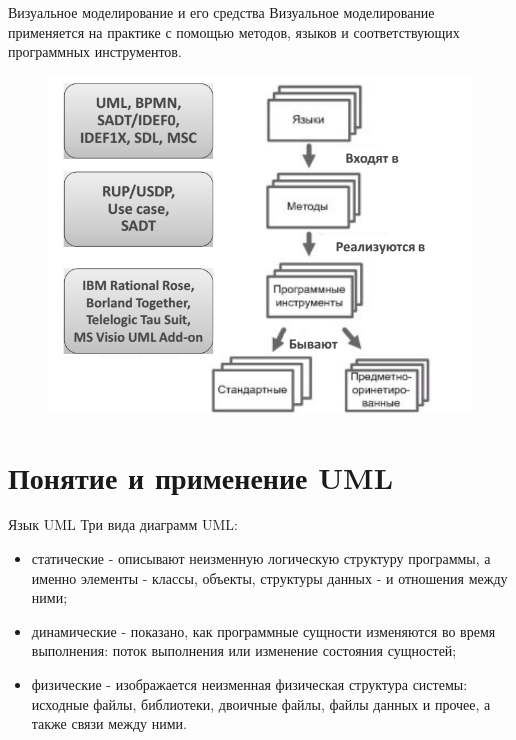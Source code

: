 \documentclass{beamer}
\begin{document}
\begin{frame}[t]{Визуальное моделирование и его средства}
Визуальное моделирование применяется на практике с помощью методов, языков и соответствующих программных инструментов.
\begin{figure}[h]
\centering
\includegraphics[scale=0.45]{images/lec03-pic02.png}
\end{figure}
\end{frame} 

\section{Понятие и применение UML}

\begin{frame}[t]{Язык UML}
Три вида диаграмм UML:
\begin{itemize}
\item статические - описывают неизменную логическую структуру программы, а именно элементы - классы, объекты, структуры данных - и отношения между ними;
\item динамические - показано, как программные сущности изменяются во время выполнения: поток выполнения или изменение состояния сущностей;
\item физические - изображается неизменная физическая структура системы: исходные файлы, библиотеки, двоичные файлы, файлы данных и прочее, а также связи между ними.
\end{itemize}
\end{frame}
\end{document}
